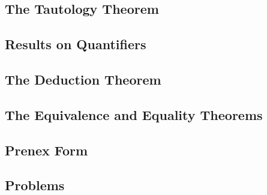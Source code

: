 \subsection{The Tautology Theorem}


\subsection{Results on Quantifiers}


\subsection{The Deduction Theorem}


\subsection{The Equivalence and Equality Theorems}


\subsection{Prenex Form}


\subsection{Problems}